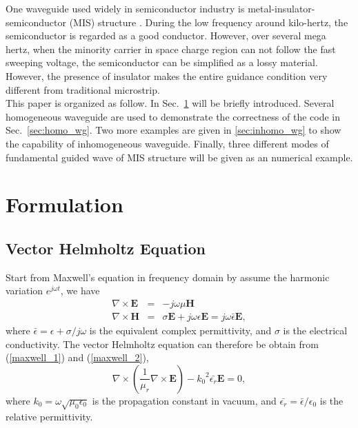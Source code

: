 \documentclass{pj}
\begin{document}
One waveguide used widely in semiconductor industry is metal-insulator-semiconductor (MIS) structure \cite{ITMTT_KiangJF_KiangJF_1996_quasitem_analysis,ITMTT_WilliamsDF_WilliamsDF_1999_metalinsulatorsemiconductor_transmission}. During the low frequency around kilo-hertz, the semiconductor is regarded as a good conductor. However, over several mega hertz, when the minority carrier in space charge region can not follow the fast sweeping voltage, the semiconductor can be simplified as a lossy material. However, the presence of insulator makes the entire guidance condition very different from traditional microstrip. \\


This paper is organized as follow. In Sec.~\ref{sec:Formulation} will be briefly introduced. Several homogeneous waveguide are used to demonstrate the correctness of the code in Sec.~\ref{sec:homo_wg}. Two more examples are given in \ref{sec:inhomo_wg} to show the capability of inhomogeneous waveguide. Finally, three different modes of fundamental guided wave of MIS structure will be given as an numerical example.\\

\section{Formulation}
\label{sec:Formulation}
\subsection{Vector Helmholtz Equation}
Start from Maxwell's equation in frequency domain by assume the harmonic variation ${e}^{j \omega t}$, we have
\begin{eqnarray}
\nabla \times \mathbf{E} &=& -j \omega \mu \mathbf{H} \label{maxwell_1}\\
\nabla \times \mathbf{H} &=& \sigma \mathbf{E} + j \omega \epsilon \mathbf{E} = j \omega \bar{\epsilon} \mathbf{E}, 
\label{maxwell_2}
\end{eqnarray}
where $\bar{\epsilon} = \epsilon + {\sigma}/{j \omega}$ is the equivalent complex permittivity, and $\sigma$ is the electrical conductivity. The vector Helmholtz equation can therefore be obtain from (\ref{maxwell_1}) and (\ref{maxwell_2}), 
\begin{equation}
\nabla \times \left( \frac{1}{\mu_r} \nabla \times \mathbf{E} \right) - {k_0}^2 \bar{\epsilon_r} \mathbf{E} = 0
\label{eq:helm}, 
\end{equation}
where $k_0 = \omega \sqrt{\mu_0 \epsilon_0}$ is the propagation constant in vacuum, and $\bar{\epsilon_r} = \bar{\epsilon} / \epsilon_0$ is the relative permittivity. 
\end{document}
